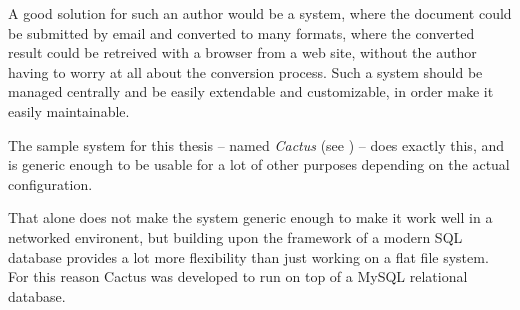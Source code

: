 A good solution for such an author would be a system, where the
document could be submitted by email and converted to many formats,
where the converted result could be retreived with a browser from a
web site, without the author having to worry at all about the
conversion process.  Such a system should be managed centrally and be
easily extendable and customizable, in order make it easily
maintainable.

The sample system for this thesis -- named \textit{Cactus} (see
) -- does exactly this, and is generic enough to be
usable for a lot of other purposes depending on the actual
configuration.

That alone does not make the system generic enough to make it work
well in a networked environent, but building upon the framework of
a modern SQL database provides a lot more flexibility than just
working on a flat file system.   For this reason Cactus was developed
to run on top of a MySQL relational database.

